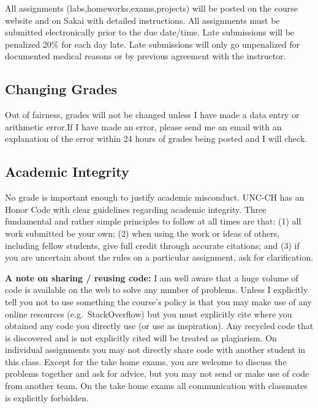 \documentclass[11pt,]{article}
\begin{document}
All assignments (labs,homeworks,exams,projects) will be posted on the
course website and on Sakai with detailed instructions. All assignments
must be submitted electronically prior to the due date/time. Late
submissions will be penalized 20\% for each day late. Late submissions
will only go unpenalized for documented medical reasons or by previous
agreement with the instructor.

\hypertarget{changing-grades}{%
\subsection{Changing Grades}\label{changing-grades}}

Out of fairness, grades will not be changed unless I have made a data
entry or arithmetic error.If I have made an error, please send me an
email with an explanation of the error within 24 hours of grades being
posted and I will check.

\hypertarget{academic-integrity}{%
\subsection{Academic Integrity}\label{academic-integrity}}

No grade is important enough to justify academic misconduct. UNC-CH has
an Honor Code with clear guidelines regarding academic integrity. Three
fundamental and rather simple principles to follow at all times are
that: (1) all work submitted be your own; (2) when using the work or
ideas of others, including fellow students, give full credit through
accurate citations; and (3) if you are uncertain about the rules on a
particular assignment, ask for clarification.

\textbf{A note on sharing / reusing code:} I am well aware that a huge
volume of code is available on the web to solve any number of problems.
Unless I explicitly tell you not to use something the course's policy is
that you may make use of any online resources (e.g.~StackOverflow) but
you must explicitly cite where you obtained any code you directly use
(or use as inspiration). Any recycled code that is discovered and is not
explicitly cited will be treated as plagiarism. On individual
assignments you may not directly share code with another student in this
class. Except for the take home exams, you are welcome to discuss the
problems together and ask for advice, but you may not send or make use
of code from another team. On the take home exams all communication with
classmates is explicitly forbidden.
\end{document}

